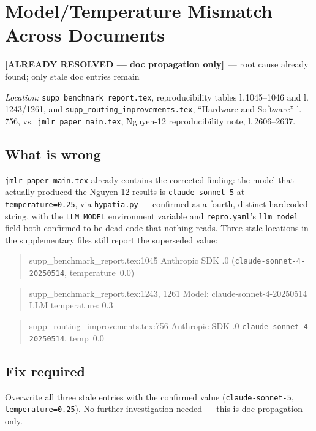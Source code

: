 \documentclass[11pt]{article}
\newcommand{\done}{\textcolor{blue!60!black}{\textbf{[ALREADY RESOLVED --- doc propagation only]}}}
\newcommand{\loc}[1]{\textit{Location:} #1\par}
\newenvironment{evidence}
  {\begin{quote}\small\ttfamily}
  {\end{quote}}
\begin{document}
\section{Model/Temperature Mismatch Across Documents}
\label{issue:11}
\done\ --- root cause already found; only stale doc entries remain

\loc{\texttt{supp\_benchmark\_report.tex}, reproducibility tables l.\,1045--1046
and l.\,1243/1261, and \texttt{supp\_routing\_improvements.tex}, ``Hardware
and Software'' l.\,756, vs.\ \texttt{jmlr\_paper\_main.tex}, Nguyen-12
reproducibility note, l.\,2606--2637.}

\subsection*{What is wrong}
\texttt{jmlr\_paper\_main.tex} already contains the corrected finding: the
model that actually produced the Nguyen-12 results is
\texttt{claude-sonnet-5} at \texttt{temperature=0.25}, via \texttt{hypatia.py}
--- confirmed as a fourth, distinct hardcoded string, with the
\texttt{LLM\_MODEL} environment variable and \texttt{repro.yaml}'s
\texttt{llm\_model} field both confirmed to be dead code that nothing reads.
Three stale locations in the supplementary files still report the
superseded value:
\begin{evidence}
supp\_benchmark\_report.tex:1045 \quad Anthropic SDK .0
(\texttt{claude-sonnet-4-20250514}, temperature~0.0)
\end{evidence}
\begin{evidence}
supp\_benchmark\_report.tex:1243, 1261 \quad Model: claude-sonnet-4-20250514
\quad LLM temperature: 0.3
\end{evidence}
\begin{evidence}
supp\_routing\_improvements.tex:756 \quad Anthropic SDK .0 \quad
\texttt{claude-sonnet-4-20250514}, temp~0.0
\end{evidence}

\subsection*{Fix required}
Overwrite all three stale entries with the confirmed value
(\texttt{claude-sonnet-5}, \texttt{temperature=0.25}). No further
investigation needed --- this is doc propagation only.
\end{document}
